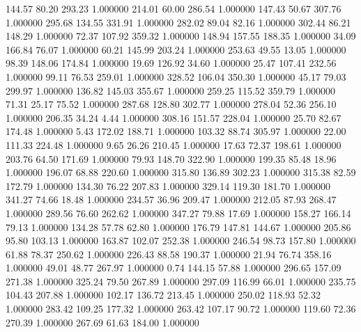     144.57     80.20    293.23  1.000000
    214.01     60.00    286.54  1.000000
    147.43     50.67    307.76  1.000000
    295.68    134.55    331.91  1.000000
    282.02     89.04     82.16  1.000000
    302.44     86.21    148.29  1.000000
     72.37    107.92    359.32  1.000000
    148.94    157.55    188.35  1.000000
     34.09    166.84     76.07  1.000000
     60.21    145.99    203.24  1.000000
    253.63     49.55     13.05  1.000000
     98.39    148.06    174.84  1.000000
     19.69    126.92     34.60  1.000000
     25.47    107.41    232.56  1.000000
     99.11     76.53    259.01  1.000000
    328.52    106.04    350.30  1.000000
     45.17     79.03    299.97  1.000000
    136.82    145.03    355.67  1.000000
    259.25    115.52    359.79  1.000000
     71.31     25.17     75.52  1.000000
    287.68    128.80    302.77  1.000000
    278.04     52.36    256.10  1.000000
    206.35     34.24      4.44  1.000000
    308.16    151.57    228.04  1.000000
     25.70     82.67    174.48  1.000000
      5.43    172.02    188.71  1.000000
    103.32     88.74    305.97  1.000000
     22.00    111.33    224.48  1.000000
      9.65     26.26    210.45  1.000000
     17.63     72.37    198.61  1.000000
    203.76     64.50    171.69  1.000000
     79.93    148.70    322.90  1.000000
    199.35     85.48     18.96  1.000000
    196.07     68.88    220.60  1.000000
    315.80    136.89    302.23  1.000000
    315.38     82.59    172.79  1.000000
    134.30     76.22    207.83  1.000000
    329.14    119.30    181.70  1.000000
    341.27     74.66     18.48  1.000000
    234.57     36.96    209.47  1.000000
    212.05     87.93    268.47  1.000000
    289.56     76.60    262.62  1.000000
    347.27     79.88     17.69  1.000000
    158.27    166.14     79.13  1.000000
    134.28     57.78     62.80  1.000000
    176.79    147.81    144.67  1.000000
    205.86     95.80    103.13  1.000000
    163.87    102.07    252.38  1.000000
    246.54     98.73    157.80  1.000000
     61.88     78.37    250.62  1.000000
    226.43     88.58    190.37  1.000000
     21.94     76.74    358.16  1.000000
     49.01     48.77    267.97  1.000000
      0.74    144.15     57.88  1.000000
    296.65    157.09    271.38  1.000000
    325.24     79.50    267.89  1.000000
    297.09    116.99     66.01  1.000000
    235.75    104.43    207.88  1.000000
    102.17    136.72    213.45  1.000000
    250.02    118.93     52.32  1.000000
    283.42    109.25    177.32  1.000000
    263.42    107.17     90.72  1.000000
    119.60     72.36    270.39  1.000000
    267.69     61.63    184.00  1.000000
